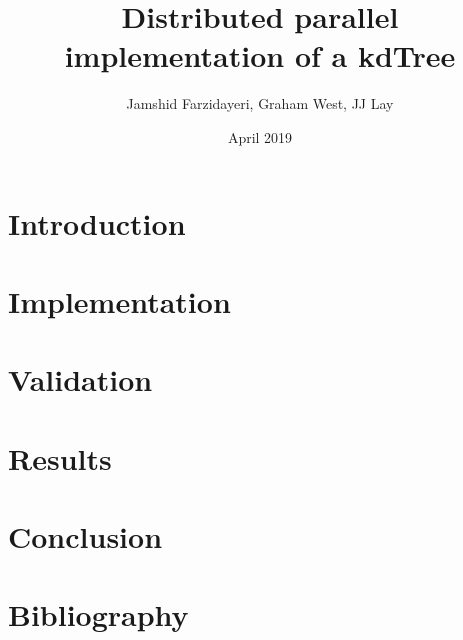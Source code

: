 \documentclass{article}
\title{Distributed parallel implementation of a kdTree}
\author{Jamshid Farzidayeri, Graham West, JJ Lay}
\date{April 2019}
\begin{document}
\maketitle


\section{Introduction}


\section{Implementation}


\section{Validation}


\section{Results}


\section{Conclusion}



\section{Bibliography}
\end{document}
